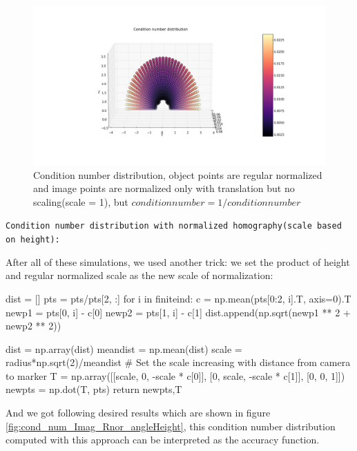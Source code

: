 \begin{figure}[H]
\hspace*{-4cm}
\centering
\includegraphics[scale=0.6]{./fig/invert_condNum.png}
\caption{Condition number distribution, object points are regular normalized and image points are normalized only with translation but no scaling(scale = 1), but $condition number = 1/condition number $}  
\label{fig:invert_condNum}
\end{figure}

\texttt{Condition number distribution with normalized homography(scale based on height):}

After all of these simulations, we used another trick: we set the product of height and regular normalized scale as the new scale of normalization:

\begin{python}\label{python:regular}
dist = []
pts = pts/pts[2, :]
for i in finiteind:
    c = np.mean(pts[0:2, i].T, axis=0).T
    newp1 = pts[0, i] - c[0]
    newp2 = pts[1, i] - c[1]
    dist.append(np.sqrt(newp1 ** 2 + newp2 ** 2))

dist = np.array(dist)
meandist = np.mean(dist)
scale = radius*np.sqrt(2)/meandist # Set the scale increasing with distance from camera to marker
T = np.array([[scale, 0, -scale * c[0]], [0, scale, -scale * c[1]], [0, 0, 1]])
newpts = np.dot(T, pts)
return newpts,T
\end{python}

And we got following desired results which are shown in figure \ref{fig:cond_num_Imag_Rnor_angleHeight}, this condition number distribution computed with this approach can be interpreted as the accuracy function.

